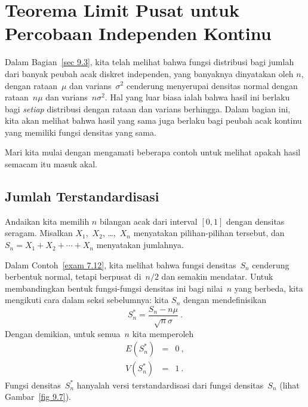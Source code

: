 \section[Percobaan Independen Kontinu]{Teorema Limit Pusat untuk
Percobaan Independen Kontinu}
\label{sec 9.4}
Dalam Bagian~\ref{sec 9.3}, kita telah melihat bahwa fungsi distribusi bagi jumlah dari banyak
peubah acak diskret independen, yang banyaknya dinyatakan oleh $n$, dengan rataan~$\mu$ dan
varians~$\sigma^2$ cenderung menyerupai densitas normal dengan rataan~$n\mu$ dan
varians~$n\sigma^2$.  Hal yang luar biasa ialah bahwa hasil ini berlaku bagi {\em setiap}
distribusi dengan rataan dan varians berhingga.  Dalam bagian ini, kita akan melihat bahwa hasil
yang sama juga berlaku bagi peubah acak
kontinu yang memiliki fungsi densitas yang sama.
\par
Mari kita mulai dengan mengamati beberapa contoh untuk melihat apakah hasil semacam itu masuk akal.

\subsection*{Jumlah Terstandardisasi}
\begin{example}
Andaikan kita memilih $n$ bilangan acak dari interval $[0,1]$ dengan densitas seragam.  Misalkan
$X_1$,~$X_2$, \dots,~$X_n$ menyatakan pilihan-pilihan tersebut, dan $S_n = X_1 + X_2 +\cdots+ X_n$
menyatakan jumlahnya.

Dalam Contoh~\ref{exam 7.12}, kita melihat bahwa fungsi densitas~$S_n$ cenderung berbentuk normal,
tetapi berpusat di~$n/2$ dan semakin mendatar.  Untuk membandingkan bentuk fungsi-fungsi densitas
ini bagi nilai~$n$ yang berbeda, kita mengikuti cara dalam seksi sebelumnya: kita
 $S_n$ dengan mendefinisikan
$$
S_n^* = \frac {S_n - n\mu}{\sqrt n \sigma}\ .
$$
Dengan demikian, untuk semua~$n$ kita memperoleh
\begin{eqnarray*}
E(S_n^*) & = & 0\ , \\
V(S_n^*) & = & 1\ .
\end{eqnarray*}
Fungsi densitas~$S_n^*$ hanyalah versi terstandardisasi dari fungsi densitas~$S_n$ (lihat
Gambar~\ref{fig 9.7}).
\end{example}

